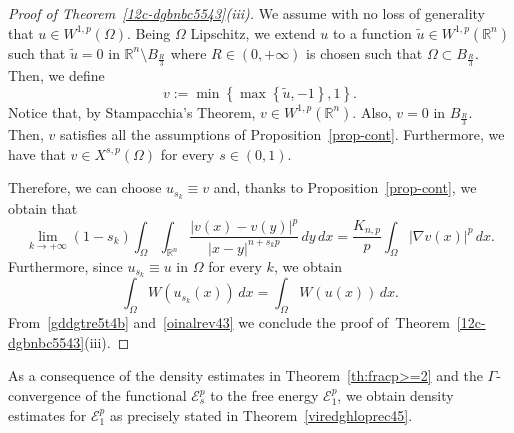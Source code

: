 \documentclass[12pt]{article}
\newcommand{\R}{\mathbb{R}}
\numberwithin{equation}{section}
\begin{document}
\begin{proof}[Proof of Theorem~\ref{12c-dgbnbc5543}(iii)]
We assume with no loss of generality that $u\in W^{1,p}(\Omega)$. Being $\Omega$ Lipschitz, we extend $u$ to a function $\tilde{u}\in W^{1,p}(\R^n)$ such that $\tilde{u}=0$ in $\R^n\setminus B_{\frac{R}{3}}$ where $R\in (0,+\infty)$ is chosen such that $\Omega\subset B_{\frac{R}{3}}$. Then, we define 
\begin{equation*}
v:=\min\left\lbrace \max\left\lbrace \tilde{u},-1 \right\rbrace, 1  \right\rbrace. 
\end{equation*}
Notice that, by Stampacchia's Theorem,
$v\in W^{1,p}(\R^n)$. Also, $v=0$ in $B_{\frac{R}{3}}$. Then, $v$ satisfies all the assumptions of Proposition~\ref{prop-cont}. Furthermore, we have that $v\in X^{s,p}(\Omega)$ for every $s\in(0,1)$.    

Therefore, we can choose $u_{s_k}\equiv v$ and, thanks to Proposition~\ref{prop-cont}, we obtain that  
\begin{equation}\label{gddgtre5t4b}
\lim_{k\to +\infty}(1-s_k)\int_{\Omega}\int_{\R^n} \frac{\left|v(x)-v(y)\right|^p}{\left|x-y\right|^{n+s_kp}}\,dy\,dx =\frac{K_{n,p}}{p}\int_{\Omega}\left|\nabla v(x)\right|^p\,dx.
\end{equation}
Furthermore, since $u_{s_k}\equiv u$ in $\Omega$ for every $k$, we obtain 
\begin{equation}\label{oinalrev43}
\int_{\Omega}W(u_{s_k}(x))\,dx=\int_{\Omega} W(u(x))\,dx.
\end{equation}
From~\eqref{gddgtre5t4b} and~\eqref{oinalrev43} we conclude the proof of~Theorem~\ref{12c-dgbnbc5543}(iii). 
\end{proof}



As a consequence of the density estimates in Theorem~\ref{th:fracp>=2} and the $\Gamma$-convergence of the functional $\mathcal{E}_s^p$ to the free energy $\mathcal{E}_1^p$, we obtain density estimates for $\mathcal{E}_1^p$ as precisely stated in Theorem~\ref{viredghloprec45}.  
\end{document}
